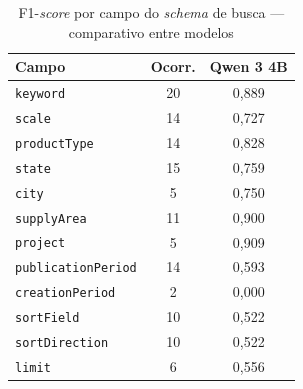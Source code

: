 \begin{table}[htbp!]
\centering
\caption{F1-\textit{score} por campo do \textit{schema} de busca --- comparativo entre modelos}
\label{tab:resultados_por_campo_estacao}
\small
\begin{tabular}{|l|c|c|}
\hline
\textbf{Campo} & \textbf{Ocorr.} & \textbf{Qwen 3 4B} \\
\hline
\texttt{keyword} & 20 & 0,889 \\
\texttt{scale} & 14 & 0,727 \\
\texttt{productType} & 14 & 0,828 \\
\texttt{state} & 15 & 0,759 \\
\texttt{city} & 5 & 0,750 \\
\texttt{supplyArea} & 11 & 0,900 \\
\texttt{project} & 5 & 0,909 \\
\texttt{publicationPeriod} & 14 & 0,593 \\
\texttt{creationPeriod} & 2 & 0,000 \\
\texttt{sortField} & 10 & 0,522 \\
\texttt{sortDirection} & 10 & 0,522 \\
\texttt{limit} & 6 & 0,556 \\
\hline
\end{tabular}
\end{table}
